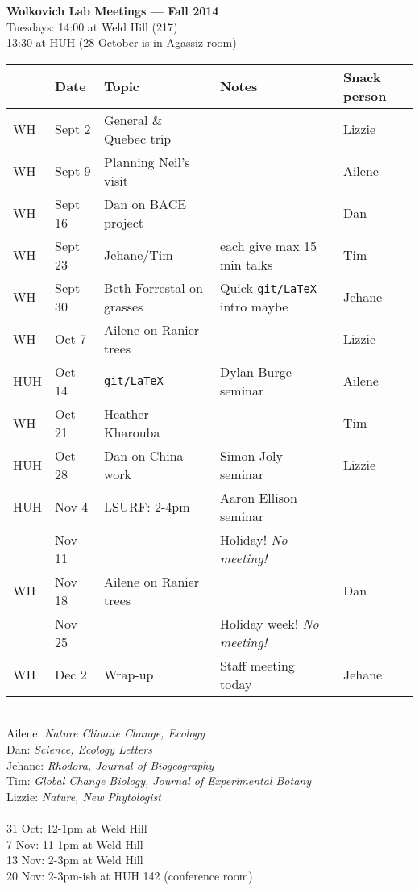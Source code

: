 \documentclass[11pt]{article}
\begin{document}
 
\raggedright
{}

\begin{center} 
{\large \textbf{Wolkovich Lab Meetings --- Fall 2014}} \\ [2pt]
Tuesdays: 14:00 at Weld Hill (217)\\13:30 at HUH (28 October is in Agassiz room)
\end{center} 

\begin{center}
\begin{tabular}{ p{0.7 cm}  p{1.5 cm}  p{5 cm}  p{5 cm}  p{1.5 cm} }  \hline \hline
 & \textbf{Date}
   & \textbf{Topic}
      & \textbf{Notes} 
         & \textbf{Snack person} \\ 
\hline \hline
WH & Sept 2  & General \& Quebec trip  &        & Lizzie \\\hline
WH & Sept 9  &  Planning Neil's visit   &   & Ailene \\\hline
WH & Sept 16  & Dan on BACE project &     &  Dan   \\\hline
WH & Sept 23 & Jehane/Tim  &  each give max 15 min talks & Tim  \\\hline
WH & Sept 30 &  Beth Forrestal on grasses  &  Quick \verb|git/LaTeX| intro maybe &  Jehane      \\\hline
WH & Oct 7 & Ailene on Ranier trees &       & Lizzie \\\hline
HUH & Oct 14 &   \verb|git/LaTeX|     & Dylan Burge seminar & Ailene \\\hline
WH & Oct 21 & Heather Kharouba &        & Tim \\\hline
HUH & Oct 28 &   Dan on China work     & Simon Joly seminar & Lizzie \\\hline
HUH & Nov 4 &  LSURF: 2-4pm    & Aaron Ellison seminar &  \\\hline
 & Nov 11 &      & Holiday! \emph{No meeting!} &  \\\hline
WH & Nov 18 &  Ailene on Ranier trees  &  & Dan \\\hline
 & Nov 25 &        & Holiday week! \emph{No meeting!} & \\\hline
WH & Dec 2 & Wrap-up    & Staff meeting today & Jehane\\\hline
\hline
\end{tabular}
\end{center}
\vspace{6pt}
\\
Ailene: \emph{Nature Climate Change, Ecology}\\
Dan: \emph{Science, Ecology Letters}\\
Jehane: \emph{Rhodora, Journal of Biogeography}\\
Tim: \emph{Global Change Biology, Journal of Experimental Botany}\\
Lizzie: \emph{Nature, New Phytologist}\\
\vspace{6pt}
\\
31 Oct: 12-1pm at Weld Hill\\
7 Nov: 11-1pm at Weld Hill\\
13 Nov: 2-3pm at Weld Hill\\
20 Nov: 2-3pm-ish at HUH 142 (conference room)\\
\end{document}
